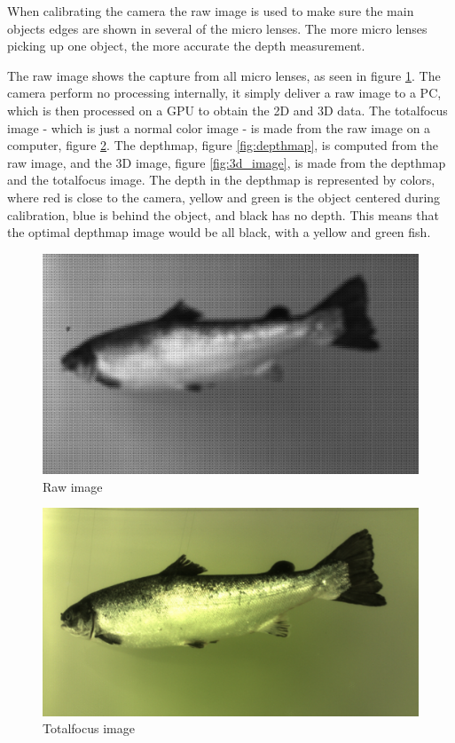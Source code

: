 When calibrating the camera the raw image is used to make sure the main objects edges are shown in several of the micro lenses. The more micro lenses picking up one object, the more accurate the depth measurement. 

The raw image shows the capture from all micro lenses, as seen in figure \ref{fig:raw_image}. The camera perform no processing internally, it simply deliver a raw image to a PC, which is then processed on a GPU to obtain the 2D and 3D data. 
The totalfocus image - which is just a normal color image - is made from the raw image on a computer, figure \ref{fig:totalfocus}. 
The depthmap, figure \ref{fig:depthmap}, is computed from the raw image, and the 3D image, figure \ref{fig:3d_image}, is made from the depthmap and the totalfocus image. 
The depth in the depthmap is represented by colors, where red is close to the camera, yellow and green is the object centered during calibration, blue is behind the object, and black has no depth. This means that the optimal depthmap image would be all black, with a yellow and green fish.

\begin{figure}[H]
    \centering
    \includegraphics[width=.9\linewidth]{images/hardware/raw}
    \caption{Raw image}
    \label{fig:raw_image}
\end{figure}

\begin{figure}[H]
    \centering
    \includegraphics[width=.9\linewidth]{images/hardware/totalfocus}
    \caption{Totalfocus image}
    \label{fig:totalfocus}
\end{figure}

